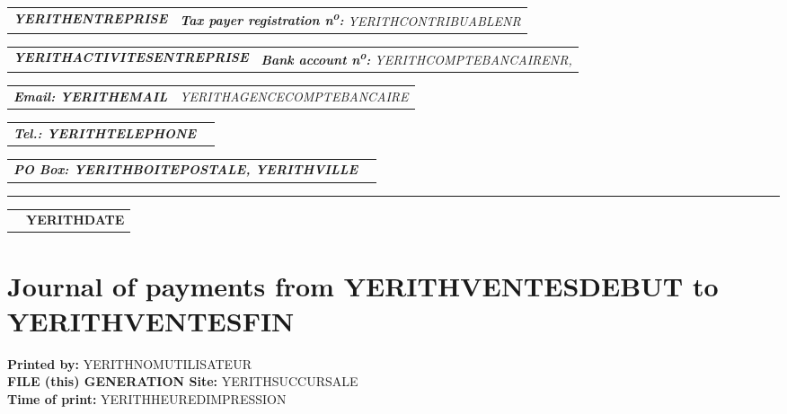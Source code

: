 \documentclass[16pt,YERITHPAPERSPEC]{article} %
\makeatletter
\newcommand{\headerrow}[2]
{\begin{tabular*}{\linewidth}{l@{\extracolsep{\fill}}r}
	#1 &
	#2 \\
\end{tabular*}}
\newcommand{\emphbold}[1]{\textbf{\emph{#1}}\xspace}
\makeatother
\begin{document}
\bigskip

\headerrow
	{\emphbold{YERITHENTREPRISE}}
	{\emph{\textbf{Tax payer registration n\textsuperscript{o}:} YERITHCONTRIBUABLENR}}
\headerrow
	{\emphbold{YERITHACTIVITESENTREPRISE}}
	{\emph{\textbf{Bank account n\textsuperscript{o}:} YERITHCOMPTEBANCAIRENR,}}
\headerrow
	{\emphbold{Email: YERITHEMAIL}}
	{\emph{YERITHAGENCECOMPTEBANCAIRE}}
\headerrow
	{\emphbold{Tel.: YERITHTELEPHONE}}
	{}
\headerrow
	{\emphbold{PO Box: YERITHBOITEPOSTALE, YERITHVILLE}}
	{}
	
\hrule

\headerrow
	{}
	{\textbf{YERITHDATE}}

\section*{Journal of payments from YERITHVENTESDEBUT to YERITHVENTESFIN}

\textbf{Printed by:} YERITHNOMUTILISATEUR\\
\textbf{FILE (this) GENERATION Site:} YERITHSUCCURSALE\\
\textbf{Time of print:} YERITHHEUREDIMPRESSION

\vspace{0.3cm}
\end{document}

